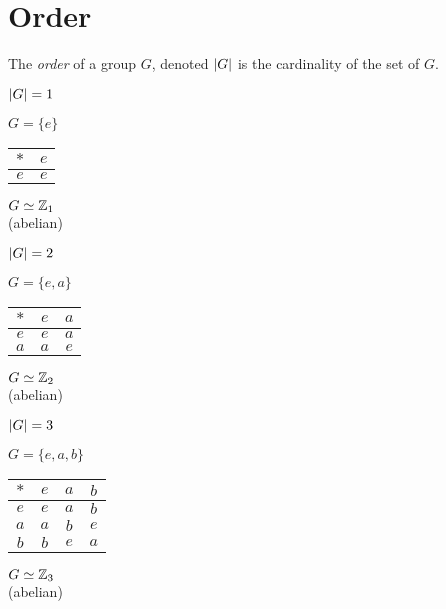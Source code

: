 \documentclass[letterpaper,12pt,fleqn]{article}
\begin{document}
\section*{Order}

\begin{definition}
  The \emph{order} of a group $G$, denoted $\lvert G\rvert$ is the cardinality of the
  set of $G$.
\end{definition}

\begin{minipage}{2in}
\underline{$\lvert G\rvert=1$}

\bigskip

$G=\{e\}$

\bigskip

\begin{tabular}{c|c}
  $*$ & $e$ \\
  \hline
  $e$ & $e$ \\
\end{tabular}

\bigskip

$G\simeq\mathbb{Z}_1$ \\
(abelian)
\end{minipage}
\begin{minipage}{2in}
\underline{$\lvert G\rvert=2$}

\bigskip

$G=\{e,a\}$

\bigskip

\begin{tabular}{c|cc}
  $*$ & $e$ & $a$ \\
  \hline
  $e$ & $e$ & $a$ \\
  $a$ & $a$ & $e$ \\
\end{tabular}

\bigskip

$G\simeq\mathbb{Z}_2$ \\
(abelian)
\end{minipage}
\begin{minipage}{2in}
\underline{$\lvert G\rvert=3$}

\bigskip

$G=\{e,a,b\}$

\bigskip

\begin{tabular}{c|ccc}
  $*$ & $e$ & $a$ & $b$ \\
  \hline
  $e$ & $e$ & $a$ & $b$ \\
  $a$ & $a$ & $b$ & $e$ \\
  $b$ & $b$ & $e$ & $a$ \\
\end{tabular}

\bigskip

$G\simeq\mathbb{Z}_3$ \\
(abelian)
\end{minipage}
\end{document}
